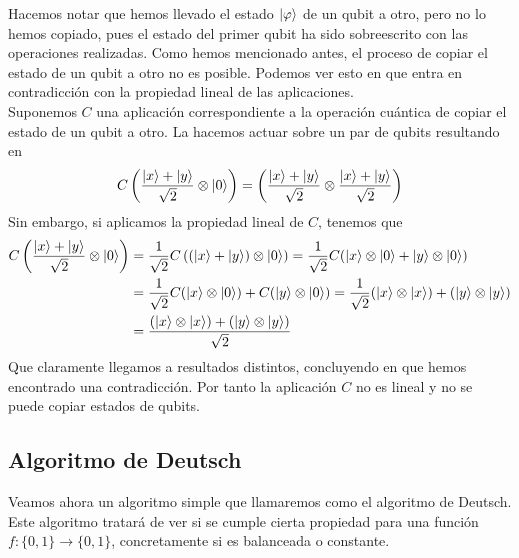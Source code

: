 \documentclass[a4paper]{article}
\numberwithin{equation}{section}
\begin{document}
Hacemos notar que hemos llevado el estado $\ket{\varphi}$ de un qubit a otro, pero no lo hemos copiado, pues el estado del primer qubit ha sido sobreescrito con las operaciones realizadas.
Como hemos mencionado antes, el proceso de copiar el estado de un qubit a otro no es posible. Podemos ver esto en que entra en contradicción con la propiedad lineal de las aplicaciones.\\ Suponemos $C$ una aplicación correspondiente a la operación cuántica de copiar el estado de un qubit a otro. La hacemos actuar sobre un par de qubits resultando en
\begin{equation}
C\left(\frac{\ket{x}+\ket{y}}{\sqrt{2}} \otimes \ket{0}\right) = 
\left(\frac{\ket{x}+\ket{y}}{\sqrt{2}} \otimes \frac{\ket{x}+\ket{y}}{\sqrt{2}}\right)
\end{equation}
Sin embargo, si aplicamos la propiedad lineal de $C$, tenemos que
\begin{equation}
\begin{split}
C\left(\frac{\ket{x}+\ket{y}}{\sqrt{2}} \otimes \ket{0}\right) 
&=
\frac{1}{\sqrt{2}}C\left((\ket{x}+\ket{y}) \otimes \ket{0}\right)
=
\frac{1}{\sqrt{2}} C(\ket{x}\otimes\ket{0} + \ket{y}\otimes\ket{0})
\\&=
\frac{1}{\sqrt{2}} C(\ket{x}\otimes\ket{0}) + C(\ket{y}\otimes\ket{0})
=
\frac{1}{\sqrt{2}} (\ket{x}\otimes\ket{x}) + (\ket{y}\otimes\ket{y})
\\&=
\frac{(\ket{x}\otimes\ket{x}) + (\ket{y}\otimes\ket{y})}{\sqrt{2}}
\end{split}
\end{equation}
Que claramente llegamos a resultados distintos, concluyendo en que hemos encontrado una contradicción. Por tanto la aplicación $C$ no es lineal y no se puede copiar estados de qubits.

\subsection{Algoritmo de Deutsch}

Veamos ahora un algoritmo simple que llamaremos como el algoritmo de Deutsch. Este algoritmo tratará de ver si se cumple cierta propiedad para una función $f:\{0, 1\} \rightarrow \{0, 1\}$, concretamente si es balanceada o constante.
\end{document}
